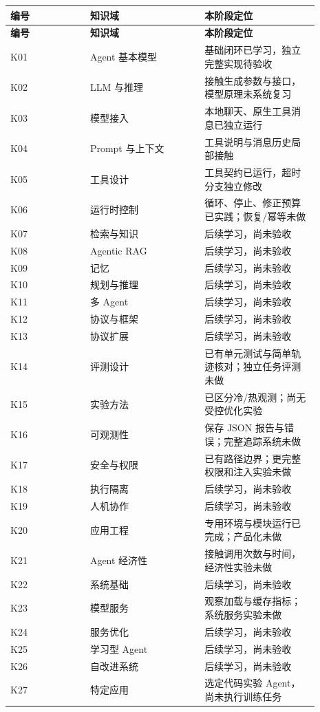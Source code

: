 {\small\setlength{\tabcolsep}{4pt}
\renewcommand{\arraystretch}{1.25}
\begin{longtable}{>{\raggedright\arraybackslash}p{0.23\linewidth}>{\raggedright\arraybackslash}p{0.33\linewidth}>{\raggedright\arraybackslash}p{0.33\linewidth}}
\toprule
\textbf{编号} & \textbf{知识域} & \textbf{本阶段定位} \\
\midrule\endfirsthead
\toprule
\textbf{编号} & \textbf{知识域} & \textbf{本阶段定位} \\
\midrule\endhead
\bottomrule\endfoot
K01 & Agent 基本模型 & 基础闭环已学习，独立完整实现待验收 \\
K02 & LLM 与推理 & 接触生成参数与接口，模型原理未系统复习 \\
K03 & 模型接入 & 本地聊天、原生工具消息已独立运行 \\
K04 & Prompt 与上下文 & 工具说明与消息历史局部接触 \\
K05 & 工具设计 & 工具契约已运行，超时分支独立修改 \\
K06 & 运行时控制 & 循环、停止、修正预算已实践；恢复/幂等未做 \\
K07 & 检索与知识 & 后续学习，尚未验收 \\
K08 & Agentic RAG & 后续学习，尚未验收 \\
K09 & 记忆 & 后续学习，尚未验收 \\
K10 & 规划与推理 & 后续学习，尚未验收 \\
K11 & 多 Agent & 后续学习，尚未验收 \\
K12 & 协议与框架 & 后续学习，尚未验收 \\
K13 & 协议扩展 & 后续学习，尚未验收 \\
K14 & 评测设计 & 已有单元测试与简单轨迹核对；独立任务评测未做 \\
K15 & 实验方法 & 已区分冷/热观测；尚无受控优化实验 \\
K16 & 可观测性 & 保存 JSON 报告与错误；完整追踪系统未做 \\
K17 & 安全与权限 & 已有路径边界；更完整权限和注入实验未做 \\
K18 & 执行隔离 & 后续学习，尚未验收 \\
K19 & 人机协作 & 后续学习，尚未验收 \\
K20 & 应用工程 & 专用环境与模块运行已完成；产品化未做 \\
K21 & Agent 经济性 & 接触调用次数与时间，经济性实验未做 \\
K22 & 系统基础 & 后续学习，尚未验收 \\
K23 & 模型服务 & 观察加载与缓存指标；系统服务实验未做 \\
K24 & 服务优化 & 后续学习，尚未验收 \\
K25 & 学习型 Agent & 后续学习，尚未验收 \\
K26 & 自改进系统 & 后续学习，尚未验收 \\
K27 & 特定应用 & 选定代码实验 Agent，尚未执行训练任务 \\
\end{longtable}}
